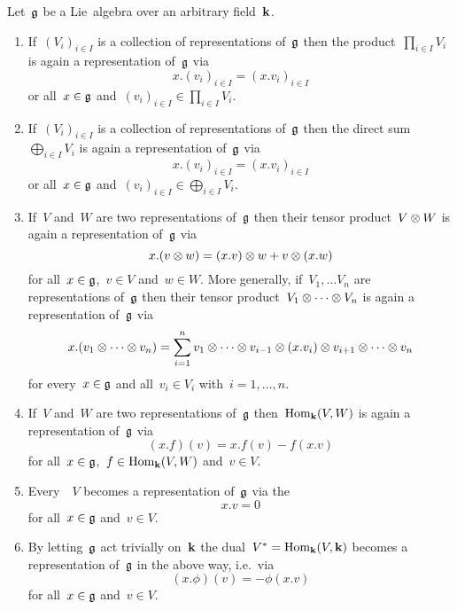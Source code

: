 \begin{proposition}
  \label{new representations from old ones}
  Let~$\mathfrak{g}$ be a Lie~algebra over an arbitrary field~$\kf$.
  \begin{enumerate}
    \item
      If~$(V_i)_{i \in I}$ is a collection of representations of~$\mathfrak{g}$ then the product~$\prod_{i \in I} V_i$ is again a representation of~$\mathfrak{g}$ via
      \[
        x.(v_i)_{i \in I}
        =
        ( x.v_i )_{i \in I}
      \]
      or all~$x \in \mathfrak{g}$ and~$(v_i)_{i \in I} \in \prod_{i \in I} V_i$.
    \item
      If~$(V_i)_{i \in I}$ is a collection of representations of~$\mathfrak{g}$ then the direct sum~$\bigoplus_{i \in I} V_i$ is again a representation of~$\mathfrak{g}$ via
      \[
        x.(v_i)_{i \in I}
        =
        ( x.v_i )_{i \in I}
      \]
      or all~$x \in \mathfrak{g}$ and~$(v_i)_{i \in I} \in \bigoplus_{i \in I} V_i$.
    \item
      If~$V$ and~$W$ are two representations of~$\mathfrak{g}$ then their tensor product~$V \otimes W$ is again a representation of~$\mathfrak{g}$ via
      \[
        x.(v \otimes w)
        =
        (x.v) \otimes w + v \otimes (x.w)
      \]
      for all~$x \in \mathfrak{g}$,~$v \in V$ and~$w \in W$.
      More generally, if~$V_1, \dotsc V_n$ are representations of~$\mathfrak{g}$ then their tensor product~$V_1 \otimes \dotsb \otimes V_n$ is again a representation of~$\mathfrak{g}$ via
      \[
        x.(v_1 \otimes \dotsb \otimes v_n)
        = \sum_{i=1}^n
                  v_1
          \otimes \dotsb
          \otimes v_{i-1}
          \otimes (x.v_i)
          \otimes v_{i+1}
          \otimes \dotsb
          \otimes v_n
      \]
      for every~$x \in \mathfrak{g}$ and all~$v_i \in V_i$ with~$i = 1, \dotsc, n$.
    \item
      If~$V$ and~$W$ are two representations of~$\mathfrak{g}$ then~$\operatorname{Hom}_{\mathbf{k}}(V,W)$ is again a representation of~$\mathfrak{g}$ via
      \[
        (x.f)(v)
        =
        x.f(v) - f(x.v)
      \]
      for all~$x \in \mathfrak{g}$,~$f \in \operatorname{Hom}_{\mathbf{k}}(V,W)$ and~$v \in V$.
    \item
      Every~{\vectorspace{$\kf$}}~$V$ becomes a representation of~$\mathfrak{g}$ via the 
      \[
        x.v
        =
        0
      \]
      for all~$x \in \mathfrak{g}$ and~$v \in V$.
    \item
      By letting~$\mathfrak{g}$ act trivially on~$\kf$ the dual~$V^* = \operatorname{Hom}_{\mathbf{k}}(V, \mathbf{k})$ becomes a representation of~$\mathfrak{g}$ in the above way, i.e.\ via
      \[
        (x.\phi)(v)
        =
        -\phi(x.v)
      \]
      for all~$x \in \mathfrak{g}$ and~$v \in V$.
  \end{enumerate}
\end{proposition}


